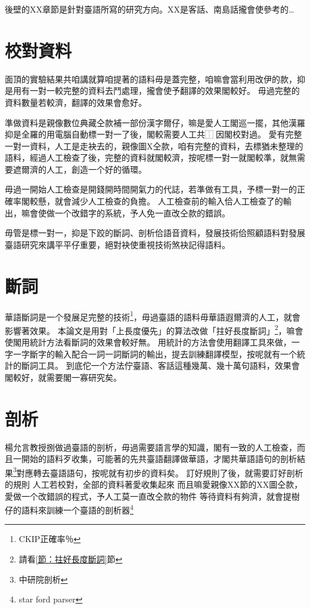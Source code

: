 \documentclass[final,oneside,onecolumn,12pt,a4paper]{book}%
\begin{document}
後壁的XX章節是針對臺語所寫的研究方向。XX是客話、南島話攏會使參考的…
\section{校對資料}
\label{節：校對資料}
面頂的實驗結果共咱講就算咱提著的語料毋是蓋完整，咱嘛會當利用改伊的款，抑是用有一對一較完整的資料去鬥處理，攏會使予翻譯的效果閣較好。
毋過完整的資料數量若較濟，翻譯的效果會愈好。

準做資料是親像數位典藏仝款補一部份漢字爾仔，嘛是愛人工閣巡一擺，其他漢羅抑是全羅的用電腦自動標一對一了後，閣較需要人工共⿰因閣校對過。
愛有完整一對一資料，人工是走袂去的，親像圖X仝款，咱有完整的資料，去標猶未整理的語料，經過人工檢查了後，完整的資料就閣較濟，按呢標一對一就閣較準，就無需要遮爾濟的人工，創造一个好的循環。

毋過一開始人工檢查是開錢開時間開氣力的代誌，若準做有工具，予標一對一的正確率閣較懸，就會減少人工檢查的負擔。
人工檢查前的輸入佮人工檢查了的輸出，嘛會使做一个改錯字的系統，予人免一直改仝款的錯誤。

毋管是標一對一，抑是下跤的斷詞、剖析佮語音資料，發展技術佮照顧語料對發展臺語研究來講平平仔重要，絕對袂使重視技術煞袂記得語料。

\section{斷詞}
\label{節：斷詞}
華語斷詞是一个發展足完整的技術\footnote{CKIP正確率％}，毋過臺語的語料毋華語遐爾濟的人工，就會影響著效果。
本論文是用對「上長度優先」的算法改做「拄好長度斷詞」\footnote{請看\ref{節：拄好長度斷詞}節}，嘛會使閣用統計方法看斷詞的效果會較好無。
用統計的方法會使用翻譯工具來做，一字一字斷字的輸入配合一詞一詞斷詞的輸出，提去訓練翻譯模型，按呢就有一个統計的斷詞工具。
到底佗一个方法佇臺語、客話這種幾萬、幾十萬句語料，效果會閣較好，就需要閣一寡研究矣。
\section{剖析}
\label{節：剖析}
楊允言教授捌做過臺語的剖析，毋過需要語言學的知識，閣有一致的人工檢查，而且一開始的語料歹收集，可能著的先共臺語翻譯做華語，才閣共華語語句的剖析結果\footnote{中研院剖析}對應轉去臺語語句，按呢就有初步的資料矣。
訂好規則了後，就需要訂好剖析的規則
人工若校對，全部的資料著愛收集起來
而且嘛愛親像XX節的XX圖仝款，愛做一个改錯誤的程式，予人工莫一直改仝款的物件
等待資料有夠濟，就會提樹仔的語料來訓練一个臺語的剖析器\footnote{star ford parser}
\end{document}
